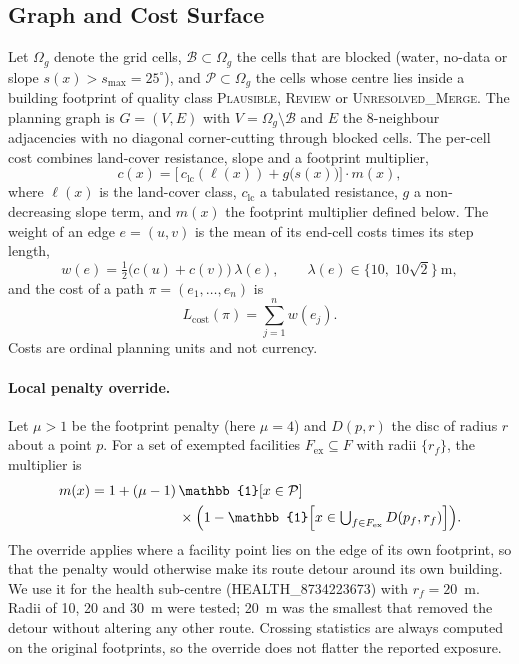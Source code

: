 \documentclass[journal]{IEEEtran}
\newcommand{\Lcost}{L_{\mathrm{cost}}}
\begin{document}
\subsection{Graph and Cost Surface}
Let $\Omega_g$ denote the grid cells, $\mathcal{B}\subset\Omega_g$ the cells that are blocked (water, no-data or slope $s(x)>s_{\max}=25^\circ$), and $\mathcal{P}\subset\Omega_g$ the cells whose centre lies inside a building footprint of quality class \textsc{Plausible}, \textsc{Review} or \textsc{Unresolved\_Merge}. The planning graph is $G=(V,E)$ with $V=\Omega_g\setminus\mathcal{B}$ and $E$ the 8-neighbour adjacencies with no diagonal corner-cutting through blocked cells. The per-cell cost combines land-cover resistance, slope and a footprint multiplier,
\begin{equation}
c(x)=\bigl[\,c_{\mathrm{lc}}(\ell(x)) + g\bigl(s(x)\bigr)\bigr]\cdot m(x),
\label{eq:cell}
\end{equation}
where $\ell(x)$ is the land-cover class, $c_{\mathrm{lc}}$ a tabulated resistance, $g$ a non-decreasing slope term, and $m(x)$ the footprint multiplier defined below. The weight of an edge $e=(u,v)$ is the mean of its end-cell costs times its step length,
\begin{equation}
w(e)=\tfrac12\bigl(c(u)+c(v)\bigr)\,\lambda(e),\qquad \lambda(e)\in\{10,\;10\sqrt2\}\ \text{m},
\end{equation}
and the cost of a path $\pi=(e_1,\dots,e_n)$ is
\begin{equation}
\Lcost(\pi)=\sum_{j=1}^{n}w(e_j).
\label{eq:lcost}
\end{equation}
Costs are ordinal planning units and not currency.

\paragraph{Local penalty override.}
Let $\mu>1$ be the footprint penalty (here $\mu=4$) and $D(p,r)$ the disc of radius $r$ about a point $p$. For a set of exempted facilities $F_{\mathrm{ex}}\subseteq F$ with radii $\{r_f\}$, the multiplier is
\begin{equation}
\begin{split}
m(x)=1+(\mu-1)\,&\mathbb{1}[x\in\mathcal{P}]\\
&\times\Bigl(1-\mathbb{1}\Bigl[x\in\textstyle\bigcup_{f\in F_{\mathrm{ex}}}D(p_f,r_f)\Bigr]\Bigr).
\end{split}
\label{eq:override}
\end{equation}
The override applies where a facility point lies on the edge of its own footprint, so that the penalty would otherwise make its route detour around its own building. We use it for the health sub-centre (HEALTH\_8734223673) with $r_f=20$~m. Radii of 10, 20 and 30~m were tested; 20~m was the smallest that removed the detour without altering any other route. Crossing statistics are always computed on the original footprints, so the override does not flatter the reported exposure.
\end{document}
